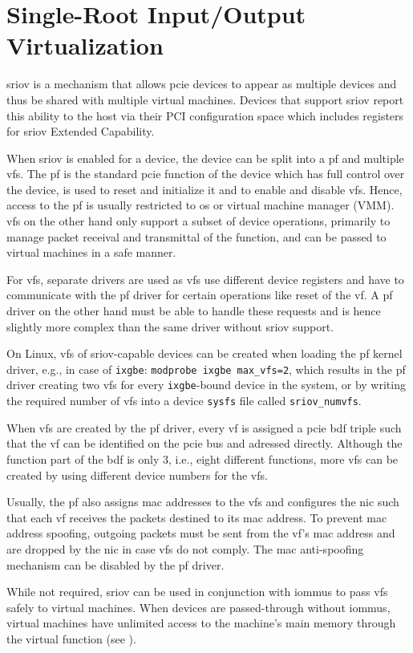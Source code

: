 \section{Single-Root Input/Output Virtualization}
\label{sec:sriov}


\Acf{sriov} is a mechanism that allows \ac{pcie} devices to appear as multiple
devices and thus be shared with multiple virtual machines. Devices that support
\ac{sriov} report this ability to the host via their PCI configuration space
which includes registers for \ac{sriov} Extended Capability.

When \ac{sriov} is enabled for a device, the device can be split into a \ac{pf}
and multiple \acp{vf}. The \ac{pf} is the standard \ac{pcie} function of the
device which has full control over the device, is used to reset and initialize
it and to enable and disable \acp{vf}. Hence, access to the \ac{pf} is usually
restricted to \ac{os} or virtual machine manager (VMM). \acp{vf} on the other
hand only support a subset of device operations, primarily to manage packet
receival and transmittal of the function, and can be passed to virtual machines
in a safe manner.

For \acp{vf}, separate drivers are used as \acp{vf} use different device
registers and have to communicate with the \ac{pf} driver for certain operations
like reset of the \ac{vf}. A \ac{pf} driver on the other hand must be able to
handle these requests and is hence slightly more complex than the same driver
without \ac{sriov} support.

On Linux, \acp{vf} of \ac{sriov}-capable devices can be created when loading the
\ac{pf} kernel driver, e.g., in case of \texttt{ixgbe}: \texttt{modprobe ixgbe
max\_vfs=2}, which results in the \ac{pf} driver creating two \acp{vf} for every
\texttt{ixgbe}-bound device in the system, or by writing the required number of
\acp{vf} into a device \texttt{sysfs} file called \texttt{sriov\_numvfs}.

When \acp{vf} are created by the \ac{pf} driver, every \ac{vf} is assigned a
\ac{pcie} \ac{bdf} triple such that the \ac{vf} can be identified on the
\ac{pcie} bus and adressed directly. Although the function part of the \ac{bdf}
is only \SI{3}{\bit}, i.e., eight different functions, more \acp{vf} can be
created by using different device numbers for the \acp{vf}.

Usually, the \ac{pf} also assigns \ac{mac} addresses to the \acp{vf} and
configures the \ac{nic} such that each \ac{vf} receives the packets destined to
its \ac{mac} address. To prevent \ac{mac} address spoofing, outgoing packets
must be sent from the \ac{vf}'s \ac{mac} address and are dropped by the \ac{nic}
in case \acp{vf} do not comply. The \ac{mac} anti-spoofing mechanism can be
disabled by the \ac{pf} driver.

While not required, \ac{sriov} can be used in conjunction with \acp{iommu} to
pass \acp{vf} safely to virtual machines. When devices are passed-through
without \acp{iommu}, virtual machines have unlimited access to the machine's
main memory through the virtual function (see ).

